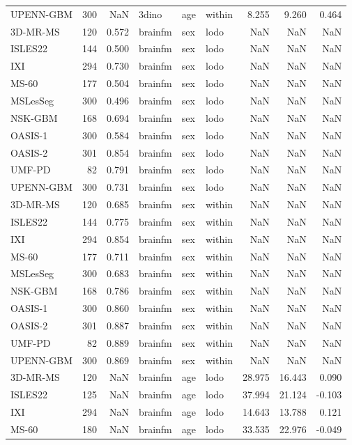 \begin{tabular}{lrrlllrrr}
UPENN-GBM & 300 & NaN & 3dino & age & within & 8.255 & 9.260 & 0.464 \\
3D-MR-MS & 120 & 0.572 & brainfm & sex & lodo & NaN & NaN & NaN \\
ISLES22 & 144 & 0.500 & brainfm & sex & lodo & NaN & NaN & NaN \\
IXI & 294 & 0.730 & brainfm & sex & lodo & NaN & NaN & NaN \\
MS-60 & 177 & 0.504 & brainfm & sex & lodo & NaN & NaN & NaN \\
MSLesSeg & 300 & 0.496 & brainfm & sex & lodo & NaN & NaN & NaN \\
NSK-GBM & 168 & 0.694 & brainfm & sex & lodo & NaN & NaN & NaN \\
OASIS-1 & 300 & 0.584 & brainfm & sex & lodo & NaN & NaN & NaN \\
OASIS-2 & 301 & 0.854 & brainfm & sex & lodo & NaN & NaN & NaN \\
UMF-PD & 82 & 0.791 & brainfm & sex & lodo & NaN & NaN & NaN \\
UPENN-GBM & 300 & 0.731 & brainfm & sex & lodo & NaN & NaN & NaN \\
3D-MR-MS & 120 & 0.685 & brainfm & sex & within & NaN & NaN & NaN \\
ISLES22 & 144 & 0.775 & brainfm & sex & within & NaN & NaN & NaN \\
IXI & 294 & 0.854 & brainfm & sex & within & NaN & NaN & NaN \\
MS-60 & 177 & 0.711 & brainfm & sex & within & NaN & NaN & NaN \\
MSLesSeg & 300 & 0.683 & brainfm & sex & within & NaN & NaN & NaN \\
NSK-GBM & 168 & 0.786 & brainfm & sex & within & NaN & NaN & NaN \\
OASIS-1 & 300 & 0.860 & brainfm & sex & within & NaN & NaN & NaN \\
OASIS-2 & 301 & 0.887 & brainfm & sex & within & NaN & NaN & NaN \\
UMF-PD & 82 & 0.889 & brainfm & sex & within & NaN & NaN & NaN \\
UPENN-GBM & 300 & 0.869 & brainfm & sex & within & NaN & NaN & NaN \\
3D-MR-MS & 120 & NaN & brainfm & age & lodo & 28.975 & 16.443 & 0.090 \\
ISLES22 & 125 & NaN & brainfm & age & lodo & 37.994 & 21.124 & -0.103 \\
IXI & 294 & NaN & brainfm & age & lodo & 14.643 & 13.788 & 0.121 \\
MS-60 & 180 & NaN & brainfm & age & lodo & 33.535 & 22.976 & -0.049 \\

\end{tabular}
